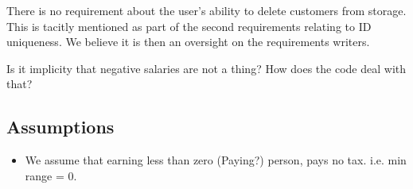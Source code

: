 There is no requirement about the user's ability to delete customers from storage. This is tacitly mentioned as part of the second requirements relating to ID uniqueness. We believe it is then an oversight on the requirements writers. 

Is it implicity that negative salaries are not a thing? How does the code deal with that? 

\subsection{Assumptions}
\begin{itemize}
	\item We assume that earning less than zero (Paying?) person, pays no tax. i.e. min range = 0. 
\end{itemize}

